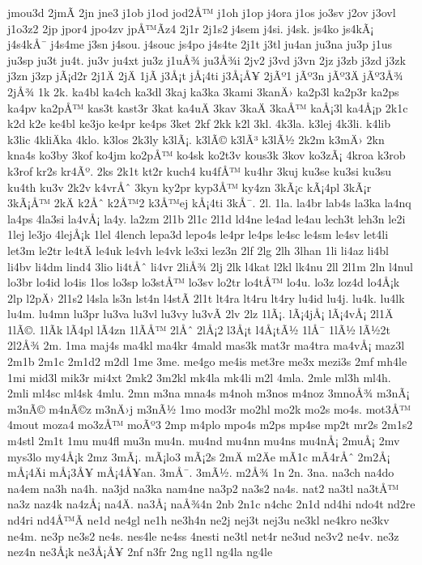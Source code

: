 {jmou3d
2jmÃ­
2jn
jne3
j1ob
j1od
jod2Å™
j1oh
j1op
j4ora
j1os
jo3sv
j2ov
j3ovl
j1o3z2
2jp
jpor4
jpo4zv
jpÅ™Ã­z4
2j1r
2j1s2
j4sem
j4si.
j4sk.
js4ko
js4kÃ¡
j4s4kÅ¯
j4s4me
j3sn
j4sou.
j4souc
js4po
j4s4te
2j1t
j3tl
ju4an
ju3na
ju3p
j1us
ju3sp
ju3t
ju4t.
ju3v
ju4xt
ju3z
j1uÅ¾
ju3Å¾i
2jv2
j3vd
j3vn
2jz
j3zb
j3zd
j3zk
j3zn
j3zp
jÃ¡d2r
2j1Ä
2jÄ
1jÃ­
j3Å¡t
jÅ¡4ti
j3Å¡Å¥
2jÃº1
jÃº3n
jÃº3Ä
jÃº3Å¾
2jÅ¾
1k
2k.
ka4bl
ka4ch
ka3dl
3kaj
ka3ka
3kami
3kanÄ›
ka2p3l
ka2p3r
ka2ps
ka4pv
ka2pÅ™
kas3t
kast3r
3kat
ka4uÄ
3kav
3kaÄ
3kaÅ™
kaÅ¡3l
ka4Å¡p
2k1c
k2d
k2e
ke4bl
ke3jo
ke4pr
ke4ps
3ket
2kf
2kk
k2l
3kl.
4k3la.
k3lej
4k3li.
k4lib
k3lic
4kliÄka
4klo.
k3los
2k3ly
k3lÃ¡.
k3lÃ©
k3lÃ³
k3lÃ½
2k2m
k3mÄ›
2kn
kna4s
ko3by
3kof
ko4jm
ko2pÅ™
ko4sk
ko2t3v
kous3k
3kov
ko3zÃ¡
4kroa
k3rob
k3rof
kr2s
kr4Ãº.
2ks
2k1t
kt2r
kuch4
ku4fÅ™
ku4hr
3kuj
ku3se
ku3si
ku3su
ku4th
ku3v
2k2v
k4vrÅˆ
3kyn
ky2pr
kyp3Å™
ky4zn
3kÃ¡c
kÃ¡4pl
3kÃ¡r
3kÃ¡Å™
2kÄ
k2Åˆ
k2Å™2
k3Å™ej
kÅ¡4ti
3kÅ¯.
2l.
1la.
la4br
lab4s
la3ka
la4nq
la4ps
4la3si
la4vÅ¡
la4y.
la2zm
2l1b
2l1c
2l1d
ld4ne
le4ad
le4au
lech3t
leh3n
le2i
1lej
le3jo
4lejÅ¡k
1lel
4lench
lepa3d
lepo4s
le4pr
le4ps
le4sc
le4sm
le4sv
let4li
let3m
le2tr
le4tÄ
le4uk
le4vh
le4vk
le3xi
lez3n
2lf
2lg
2lh
3lhan
1li
li4az
li4bl
li4bv
li4dm
lind4
3lio
li4tÅˆ
li4vr
2liÅ¾
2lj
2lk
l4kat
l2kl
lk4nu
2ll
2l1m
2ln
l4nul
lo3br
lo4id
lo4is
1los
lo3sp
lo3stÅ™
lo3sv
lo2tr
lo4tÅ™
lo4u.
lo3z
loz4d
lo4Å¡k
2lp
l2pÄ›
2l1s2
l4sla
ls3n
lst4n
l4stÃ­
2l1t
lt4ra
lt4ru
lt4ry
lu4id
lu4j.
lu4k.
lu4lk
lu4m.
lu4mn
lu3pr
lu3va
lu3vl
lu3vy
lu3vÃ­
2lv
2lz
1lÃ¡.
lÃ¡4jÅ¡
lÃ¡4vÅ¡
2l1Ä
1lÃ©.
1lÃ­k
lÃ­4pl
lÃ­4zn
1lÃ­Å™
2lÅˆ
2lÅ¡2
l3Å¡t
l4Å¡tÃ½
1lÅ¯
1lÃ½
lÃ½2t
2l2Å¾
2m.
1ma
maj4s
ma4kl
ma4kr
4mald
mas3k
mat3r
ma4tra
ma4vÅ¡
maz3l
2m1b
2m1c
2m1d2
m2dl
1me
3me.
me4go
me4is
met3re
me3x
mezi3s
2mf
mh4le
1mi
mid3l
mik3r
mi4xt
2mk2
3m2kl
mk4la
mk4li
m2l
4mla.
2mle
ml3h
ml4h.
2mli
ml4sc
ml4sk
4mlu.
2mn
m3na
mna4s
m4noh
m3nos
m4noz
3mnoÅ¾
m3nÃ¡
m3nÃ©
m4nÃ©z
m3nÄ›j
m3nÃ½
1mo
mod3r
mo2hl
mo2k
mo2s
mo4s.
mot3Å™
4mout
moza4
mo3zÅ™
moÃº3
2mp
m4plo
mpo4s
m2ps
mp4se
mp2t
mr2s
2m1s2
m4stl
2m1t
1mu
mu4fl
mu3n
mu4n.
mu4nd
mu4nn
mu4ns
mu4nÅ¡
2muÅ¡
2mv
mys3lo
my4Å¡k
2mz
3mÃ¡.
mÃ¡lo3
mÃ¡2s
2mÄ
m2Äe
mÃ­1c
mÃ­4rÅˆ
2m2Å¡
mÅ¡4Äi
mÅ¡3Å¥
mÅ¡4Å¥an.
3mÅ¯.
3mÃ½.
m2Å¾
1n
2n.
3na.
na3ch
na4do
na4em
na3h
na4h.
na3jd
na3ka
nam4ne
na3p2
na3s2
na4s.
nat2
na3tl
na3tÅ™
na3z
naz4k
na4zÅ¡
na4Ä.
na3Å¡
naÅ¾4n
2nb
2n1c
n4chc
2n1d
nd4hi
ndo4t
nd2re
nd4ri
nd4Å™Ã­
ne1d
ne4gl
ne1h
ne3h4n
ne2j
nej3t
nej3u
ne3kl
ne4kro
ne3kv
ne4m.
ne3p
ne3s2
ne4s.
nes4le
ne4ss
4nesti
ne3tl
net4r
ne3ud
ne3v2
ne4v.
ne3z
nez4n
ne3Å¡k
ne3Å¡Å¥
2nf
n3fr
2ng
ng1l
ng4la
ng4le
}
